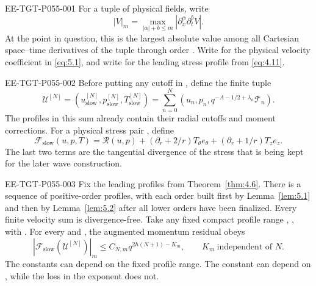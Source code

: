 %
\begin{EESegment}{EE-TGT-P055-001}
For a tuple  of physical fields, write
\begin{equation}
 |V|_m=\max_{|\alpha|+b\leq m}|\partial_x^\alpha\partial_t^bV|.
 \tag{5.23}\label{eq:5.23}
\end{equation}
At the point in question, this is the largest absolute value among all Cartesian space--time derivatives of the tuple
through order . Write
 for the physical velocity coefficient in
\eqref{eq:5.1}, and write  for the leading stress profile from \eqref{eq:4.11}.
\end{EESegment}

\begin{EESegment}{EE-TGT-P055-002}
Before putting any cutoff in , define the finite tuple
\[
 \mathcal U^{[N]}=
 (u_{\mathrm{slow}}^{[N]},p_{\mathrm{slow}}^{[N]},T_{\mathrm{slow}}^{[N]})
 =\sum_{n=0}^{N}(u_n,p_n,q^{-A-1/2+\lambda_n}\mathcal T_n).
\]
The profiles in this sum already contain their radial cutoffs and moment corrections. For a physical stress pair
, define
\begin{equation}
 \mathcal F_{\mathrm{slow}}(u,p,T)=\mathscr R(u,p)
 +(\partial_r+2/r)T_\theta e_\theta+(\partial_r+1/r)T_ze_z.
 \tag{5.24}\label{eq:5.24}
\end{equation}
The last two terms are the tangential divergence of the stress that is being kept for the later wave construction.
\end{EESegment}

\begin{proposition}\label{prop:5.3}
\begin{EESegment}{EE-TGT-P055-003}
Fix the leading profiles from Theorem~\ref{thm:4.6}. There is a sequence of positive-order profiles, with each order
built first by Lemma~\ref{lem:5.1} and then by Lemma~\ref{lem:5.2} after all lower orders have been finalized. Every
finite velocity sum  is divergence-free. Take any fixed compact profile
range , , with
. For every  and
, the augmented momentum residual obeys
\begin{equation}
 |\mathcal F_{\mathrm{slow}}(\mathcal U^{[N]})|_m
 \leq C_{N,m}q^{2h(N+1)-K_m},
 \qquad K_m\ \text{independent of }N.
 \tag{5.25}\label{eq:5.25}
\end{equation}
The constants can depend on the fixed profile range. The constant  can depend on
, while the loss  in the exponent does not.
\end{EESegment}
\end{proposition}

